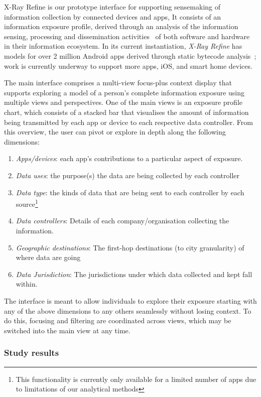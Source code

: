 \documentclass[sigchi-a, authorversion]{acmart}
\begin{document}
X-Ray Refine is our prototype interface for supporting sensemaking of 
information collection by connected devices and apps,  It consists of 
an information exposure profile, derived through an analysis of 
the information sensing, processing and dissemination activities~\cite{btdchi} of 
both software and hardware in their information ecosystem.   
In its current instantiation, \emph{X-Ray Refine} has models for over 2 million 
Android apps derived through static bytecode analysis~\cite{refine};  work is currently 
underway to support more apps, iOS, and smart home devices.

The main interface comprises a multi-view focus-plus context display
that supports exploring a model of a person's complete information exposure
using multiple views and perspectives. One of the main views is an exposure 
profile chart, which consists of a stacked bar that visualises the 
amount of information being transmitted by each app or device to each
respective data controller.  From this overview, the user can pivot or
explore in depth along the following dimensions:

\begin{enumerate}
\item \emph{Apps/devices}: each app's contributions to a particular aspect of exposure.
\item \emph{Data uses}: the purpose(s) the data are being collected by each controller
\item \emph{Data type}: the kinds of data that are being sent to each controller by each source\footnote{This functionality is currently only available for a limited number of apps due to limitations of our analytical methods}
\item \emph{Data controllers}: Details of each company/organisation collecting the information.
\item \emph{Geographic destinations}: The first-hop destinations (to city granularity) of where data are going
\item \emph{Data Jurisdiction}: The jurisdictions under which data collected and kept fall within.
\end{enumerate}

The interface is meant to allow individuals to explore their exposure starting
with any of the above dimensions to any others seamlessly without losing context.
To do this, focusing and filtering are coordinated across views, which may
be switched into the main view at any time.

\subsubsection{Study results}
\end{document}
